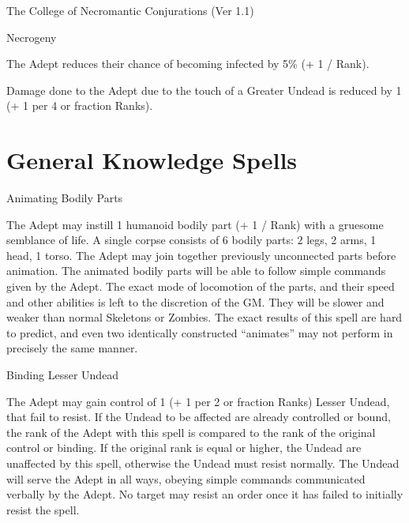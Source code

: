 \begin{Chapter}{The College of Necromantic Conjurations (Ver 1.1)}
\begin{talent}[T-3]{Necrogeny}
\begin{effects}
\begin{Description}
\item[Infection] The Adept reduces their chance of becoming infected
  by 5\% (+ 1 / Rank).

\item[Undead Draining] Damage done to the Adept due to the touch of a
Greater Undead is reduced by 1 (+ 1 per 4 or fraction Ranks).
\end{Description}
\end{effects}
\end{talent}

\section{General Knowledge Spells}

\begin{spell}[G-1]{Animating Bodily Parts}
\begin{effects}
The Adept may instill 1 humanoid bodily part (+ 1 / Rank) with a
gruesome semblance of life.  A single corpse consists of 6 bodily
parts: 2 legs, 2 arms, 1 head, 1 torso.  The Adept may join together
previously unconnected parts before animation.  The animated bodily
parts will be able to follow simple commands given by the Adept.  The
exact mode of locomotion of the parts, and their speed and other
abilities is left to the discretion of the GM.  They will be slower
and weaker than normal Skeletons or Zombies. The exact results of this
spell are hard to predict, and even two identically constructed
“animates” may not perform in precisely the same manner.
\end{effects}
\end{spell}

\begin{spell}[G-2]{Binding Lesser Undead}
\begin{effects}
The Adept may gain control of 1 (+ 1 per 2 or fraction Ranks) Lesser
Undead, that fail to resist.  If the Undead to be affected are already
controlled or bound, the rank of the Adept with this spell is compared
to the rank of the original control or binding.  If the original rank
is equal or higher, the Undead are unaffected by this spell, otherwise
the Undead must resist normally. The Undead will serve the Adept in
all ways, obeying simple commands communicated verbally by the Adept.
No target may resist an order once it has failed to initially resist
the spell.
\end{effects}
\end{spell}


\end{Chapter}

